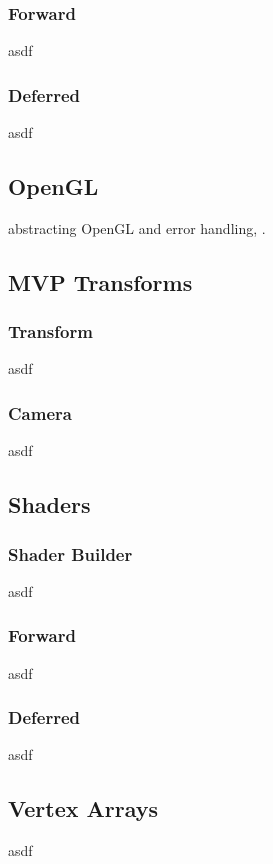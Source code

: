\begin{multicols}{2}
  \subsubsection{Forward}
  asdf

  \subsubsection{Deferred}
  asdf

  \subsection{OpenGL}
  abstracting OpenGL and error handling, .

  \subsection{MVP Transforms}

  \subsubsection{Transform}
  asdf

  \subsubsection{Camera}
  asdf

  \subsection{Shaders}

  \subsubsection{Shader Builder}
  asdf

  \subsubsection{Forward}
  asdf

  \subsubsection{Deferred}
  asdf

  \subsection{Vertex Arrays}
  asdf


\end{multicols}

